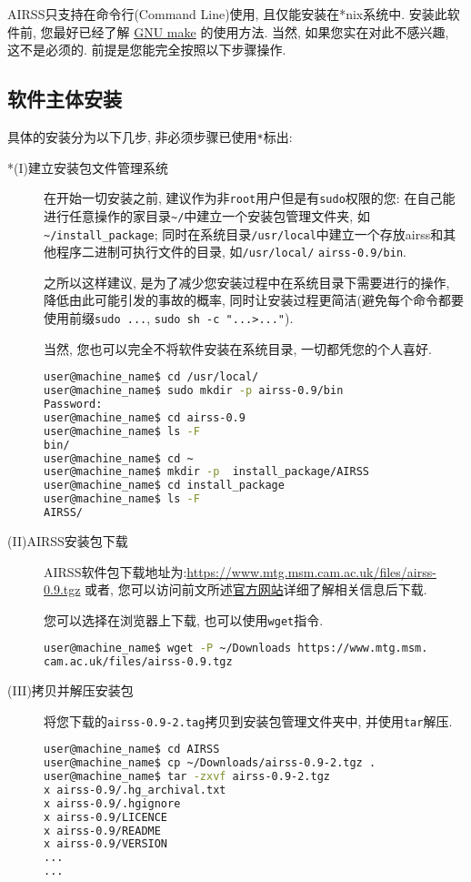 \documentclass[a4paper, 10pt]{article}
\begin{document}
AIRSS只支持在命令行(Command Line)使用, 且仅能安装在*nix系统中. 安装此软件前, 您最好已经了解 \href{https://www.gnu.org/software/make/manual/}{GNU make} 的使用方法. 当然, 如果您实在对此不感兴趣, 这不是必须的. 前提是您能完全按照以下步骤操作.

\subsection{软件主体安装}
具体的安装分为以下几步, 非必须步骤已使用\verb|*|标出:
\begin{description}
\item [*(I)建立安装包文件管理系统] 在开始一切安装之前, 建议作为非\verb|root|用户但是有\verb|sudo|权限的您: 在自己能进行任意操作的家目录\verb|~/|中建立一个安装包管理文件夹, 如\verb|~/install_package|; 同时在系统目录\verb|/usr/local|中建立一个存放airss和其他程序二进制可执行文件的目录, 如\verb|/usr/local/| \verb|airss-0.9/bin|. 

之所以这样建议, 是为了减少您安装过程中在系统目录下需要进行的操作, 降低由此可能引发的事故的概率, 同时让安装过程更简洁(避免每个命令都要使用前缀\verb|sudo ...|, \verb|sudo sh -c "...>..."|). 

当然, 您也可以完全不将软件安装在系统目录, 一切都凭您的个人喜好.
\begin{lstlisting}[language={bash}]
user@machine_name$ cd /usr/local/
user@machine_name$ sudo mkdir -p airss-0.9/bin
Password:
user@machine_name$ cd airss-0.9
user@machine_name$ ls -F 
bin/
user@machine_name$ cd ~
user@machine_name$ mkdir -p  install_package/AIRSS
user@machine_name$ cd install_package
user@machine_name$ ls -F
AIRSS/
\end{lstlisting}

\item [(II)AIRSS安装包下载]AIRSS软件包下载地址为:\url{https://www.mtg.msm.cam.ac.uk/files/airss-0.9.tgz}
或者, 您可以访问前文所述\href{https://www.mtg.msm.cam.ac.uk/Codes/AIRSS}{官方网站}详细了解相关信息后下载.

您可以选择在浏览器上下载, 也可以使用\verb|wget|指令.

\begin{lstlisting}[language={bash}]
user@machine_name$ wget -P ~/Downloads https://www.mtg.msm.
cam.ac.uk/files/airss-0.9.tgz
\end{lstlisting}

\item [(III)拷贝并解压安装包] 将您下载的\verb|airss-0.9-2.tag|拷贝到安装包管理文件夹中, 并使用\verb|tar|解压.
\begin{lstlisting}[language={bash}]
user@machine_name$ cd AIRSS
user@machine_name$ cp ~/Downloads/airss-0.9-2.tgz .
user@machine_name$ tar -zxvf airss-0.9-2.tgz
x airss-0.9/.hg_archival.txt
x airss-0.9/.hgignore
x airss-0.9/LICENCE
x airss-0.9/README
x airss-0.9/VERSION 
...
...
\end{lstlisting}


\end{description}
\end{document}
